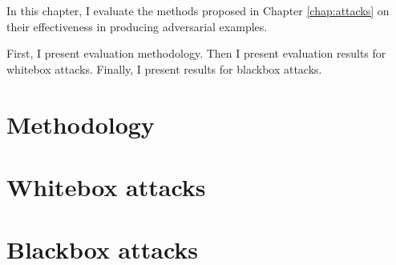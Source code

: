 In this chapter, I evaluate the methods proposed in Chapter \ref{chap:attacks} on their effectiveness in producing adversarial examples.

First, I present evaluation methodology. Then I present evaluation results for whitebox attacks. Finally, I present results for blackbox attacks.

\section{Methodology}
\label{sec:methodology}


\section{Whitebox attacks}
\label{sec:whitebox-attacks}


\section{Blackbox attacks}
\label{sec:blackbox-attacks}
